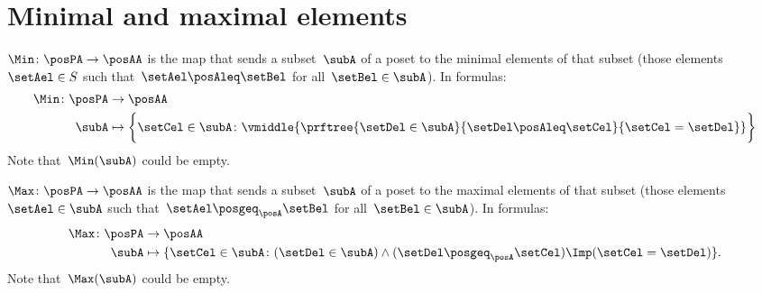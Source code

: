 \section{Minimal and maximal elements}

\begin{ctdefinition}
    \label{def:Min}
    $\Min \colon \posPA \to \posAA$ is the map that sends a subset~$\subA$ of a poset to the minimal elements of that subset (those elements~$\setAel \in S$ such that~$\setAel \posAleq \setBel$ for all~$\setBel \in \subA$).
    In formulas:
    \todousedefinemap
    \begin{equation*}
        \begin{aligned}
            \Min \colon \posPA & \to \posAA      \\
            \subA              & \mapsto \bigg\{
            \setCel\in \subA\colon
            \vmiddle{
                \prftree{
                    \setDel\in \subA
                }{
                    \setDel\posAleq \setCel
                }{
                    \setCel=\setDel
                }
            }
            \bigg\}
        \end{aligned}
    \end{equation*}
    Note that~$\Min(\subA)$ could be empty.
\end{ctdefinition}

\begin{ctdefinition}
    \label{def:Max}
    $\Max \colon \posPA \to \posAA$ is the map that sends a subset~$\subA$ of a poset to the maximal elements of that subset (those elements~$\setAel \in \subA$ such that~$\setAel \posgeq_\posA \setBel$ for all~$\setBel \in \subA$).
    In formulas:
    \begin{equation*}
        \begin{aligned}
            \Max \colon \posPA & \to \posAA                                                                                                        \\
            \subA              & \mapsto \{ \setCel\in \subA\colon (\setDel\in \subA)\wedge(\setDel\posgeq_\posA \setCel)\Imp (\setCel=\setDel)\}.
        \end{aligned}
    \end{equation*}
    Note that~$\Max(\subA)$ could be empty.
\end{ctdefinition}

